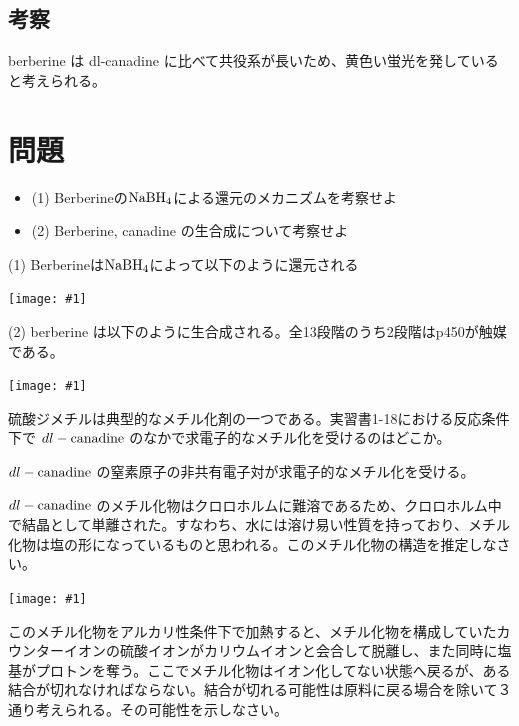 \documentclass[a4paper,papersize,dvipdfmx]{jsarticle}
\newcommand{\pic}[1]{\begin{center} \texttt{[image: \#1]} \end{center}}   %
\newcommand{\pict}[2]{\begin{center} \texttt{[image: \#1]} \end{center}}   %
\begin{document}
\subsection*{考察}
berberine は dl-canadine に比べて共役系が長いため、黄色い蛍光を発していると考えられる。


\section*{問題}

\begin{tcolorbox}[colback=white,colbacktitle=black,coltitle=white,title={問題1}]
\begin{itemize}
\item (1) Berberineの$\rm NaBH_4$による還元のメカニズムを考察せよ
\item (2) Berberine, canadine の生合成について考察せよ
\end{itemize}
\end{tcolorbox}

(1)  Berberineは$\rm NaBH_4$によって以下のように還元される
\pict{imgs/kd01.jpg}{12}

(2)  berberine は以下のように生合成される。全13段階のうち2段階はp450が触媒である。
\pic{imgs/kd02.jpg}

\begin{tcolorbox}[colback=white,colbacktitle=black,coltitle=white,title={問題2}]
硫酸ジメチルは典型的なメチル化剤の一つである。実習書1-18における反応条件下で $dl-\rm canadine$ のなかで求電子的なメチル化を受けるのはどこか。
\end{tcolorbox}

$dl-\rm canadine$ の窒素原子の非共有電子対が求電子的なメチル化を受ける。

\begin{tcolorbox}[colback=white,colbacktitle=black,coltitle=white,title={問題3}]
$dl-\rm canadine$ のメチル化物はクロロホルムに難溶であるため、クロロホルム中で結晶として単離された。すなわち、水には溶け易い性質を持っており、メチル化物は塩の形になっているものと思われる。このメチル化物の構造を推定しなさい。
\end{tcolorbox}

\pict{imgs/kd03.jpeg}{4}

\begin{tcolorbox}[colback=white,colbacktitle=black,coltitle=white,title={問題4}]
このメチル化物をアルカリ性条件下で加熱すると、メチル化物を構成していたカウンターイオンの硫酸イオンがカリウムイオンと会合して脱離し、また同時に塩基がプロトンを奪う。ここでメチル化物はイオン化してない状態へ戻るが、ある結合が切れなければならない。結合が切れる可能性は原料に戻る場合を除いて３通り考えられる。その可能性を示しなさい。
\end{tcolorbox}
\end{document}
